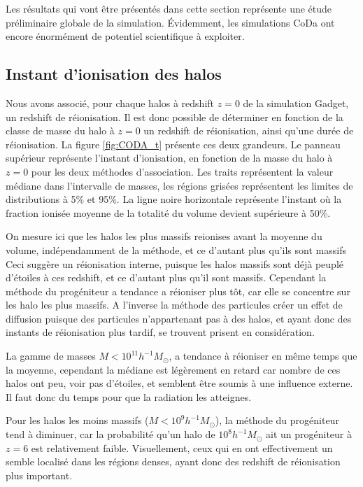 Les résultats qui vont être présentés dans cette section représente une étude préliminaire globale de la simulation.
Évidemment, les simulations \ac{CoDa} ont encore énormément de potentiel scientifique à exploiter.

\subsection{Instant d'ionisation des halos}

Nous avons associé, pour chaque halos à redshift $z=0$ de la simulation Gadget, un redshift de réionisation.
Il est donc possible de déterminer en fonction de la classe de masse du halo à $z=0$ un redshift de réionisation, ainsi qu'une durée de réionisation.
La figure \ref{fig:CODA_t} présente ces deux grandeurs.
Le panneau supérieur représente l'instant d'ionisation, en fonction de la masse du halo à $z=0$ pour les deux méthodes d'association.
Les traits représentent la valeur médiane dans l'intervalle de masses, les régions grisées représentent les limites de distributions à 5\% et 95\%.
La ligne noire horizontale représente l'instant où la fraction ionisée moyenne de la totalité du volume devient supérieure à 50\%.

On mesure ici que les halos les plus massifs reionises avant la moyenne du volume, indépendamment de la méthode, et ce d'autant plus qu'ils sont massifs
Ceci suggère un réionisation interne, puisque les halos massifs sont déjà peuplé d'étoiles à ces redshift, et ce d'autant plus qu'il sont massifs.
Cependant la méthode du progéniteur a tendance a réioniser plus tôt, car elle se concentre sur les halo les plus massifs.
A l'inverse la méthode des particules créer un effet de diffusion puisque des particules n'appartenant pas à des halos, et ayant donc des instants de réionisation plus tardif, se trouvent prisent en considération.

La gamme de masses $M <10^{11} h^{-1}M_\odot$, a tendance à réioniser en même temps que la moyenne, cependant la médiane est légèrement en retard car nombre de ces halos ont peu, voir pas d'étoiles, et semblent être soumis à une influence externe.
Il faut donc du temps pour que la radiation les atteignes.

Pour les halos les moins massifs ($M<10^9 h^{-1}M_\odot$), la méthode du progéniteur tend à diminuer, car la probabilité qu'un halo de $10^8 h^{-1} M_\odot$ ait un progéniteur à $z=6$ est relativement faible.
Visuellement, ceux qui en ont effectivement un semble localisé dans les régions denses, ayant donc des redshift de réionisation plus important.

